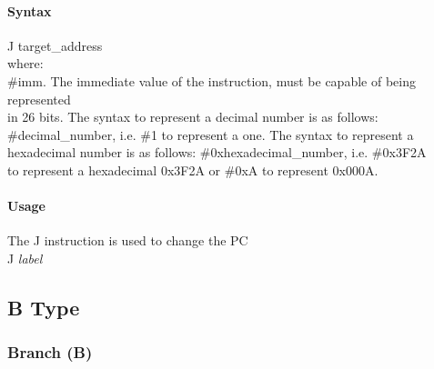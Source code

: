 \documentclass[12pt]{article}
\begin{document}
    \paragraph{Syntax}
    \begin{flushleft}
    J target\_address\\ 
    \vspace{1em}        %
    where:\\
    \vspace{1em}
    \#imm.  \hspace{1.8em} The immediate value of the instruction, must be capable of being represented\\             \hspace{5.4em} in 26 bits. The syntax to represent a decimal number is as follows:\\
            \hspace{5.4em} \#decimal\_number, i.e. \#1 to represent a one. The syntax to represent a\\
            \hspace{5.4em} hexadecimal number is as follows: \#0xhexadecimal\_number, i.e. \#0x3F2A \\
            \hspace{5.4em} to represent a hexadecimal 0x3F2A or \#0xA to represent 0x000A.\\
    \end{flushleft}
    
    \paragraph{Usage}
    \begin{flushleft}
    The J instruction is used to change the PC \\
    \vspace{1em}
    J \textit{label} 
    \end{flushleft}

\newpage
\subsection{B Type}

    \subsubsection{Branch (B)}
        
\end{document}

